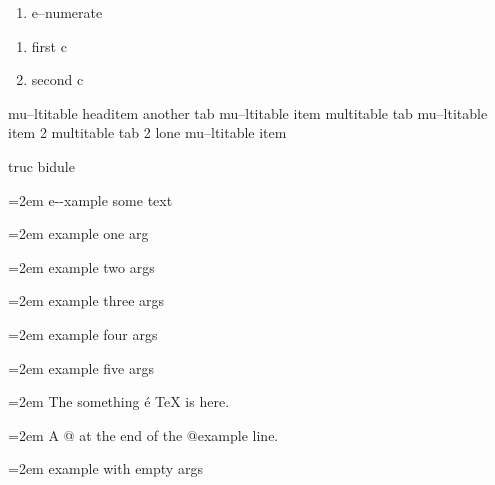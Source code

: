 \documentclass{book}
\begin{document}
\begin{enumerate}[label=\alph*.]
\item e--numerate
\end{enumerate}

\begin{enumerate}[label=\alph*.,start=3]
\item first c
\item second c
\end{enumerate}

mu--ltitable headitem another tab
mu--ltitable item multitable tab
mu--ltitable item 2 multitable tab 2
%
lone mu--ltitable item

truc bidule

\par\begingroup\obeylines\obeyspaces\frenchspacing\leftskip=2em\relax\parskip=0pt\relax\ttfamily{}%
e{-}{-}xample  some
   text
\endgroup{}%

\par\begingroup\obeylines\obeyspaces\frenchspacing\leftskip=2em\relax\parskip=0pt\relax\ttfamily{}%
example one arg
\endgroup{}%

\par\begingroup\obeylines\obeyspaces\frenchspacing\leftskip=2em\relax\parskip=0pt\relax\ttfamily{}%
example two args
\endgroup{}%

\par\begingroup\obeylines\obeyspaces\frenchspacing\leftskip=2em\relax\parskip=0pt\relax\ttfamily{}%
example three args
\endgroup{}%

\par\begingroup\obeylines\obeyspaces\frenchspacing\leftskip=2em\relax\parskip=0pt\relax\ttfamily{}%
example four args
\endgroup{}%

\par\begingroup\obeylines\obeyspaces\frenchspacing\leftskip=2em\relax\parskip=0pt\relax\ttfamily{}%
example five args
\endgroup{}%

\par\begingroup\obeylines\obeyspaces\frenchspacing\leftskip=2em\relax\parskip=0pt\relax\ttfamily{}%
The something \'{e} \TeX{} is here.
\endgroup{}%

\par\begingroup\obeylines\obeyspaces\frenchspacing\leftskip=2em\relax\parskip=0pt\relax\ttfamily{}%
A @ at the end of the @example line.
\endgroup{}%

\par\begingroup\obeylines\obeyspaces\frenchspacing\leftskip=2em\relax\parskip=0pt\relax\ttfamily{}%
example with empty args
\endgroup{}%
\end{document}
